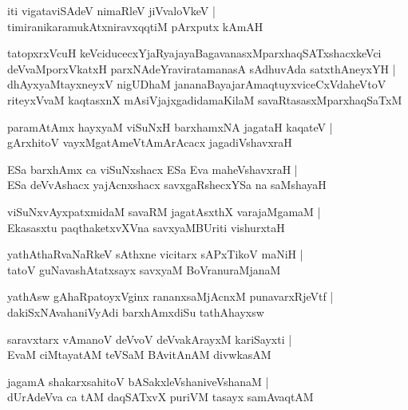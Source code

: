 \begin{shloka}
iti vigataviSAdeV nimaRleV jiVvaloVkeV |\\
timiranikaramukAtxniravxqqtiM pArxputx kAmAH
\end{shloka}

\begin{shloka}
tatopxrxVcuH keVciducecxYjaRyajayaBagavanasxMparxhaqSATxshacxkeVci\\
deVvaMporxVkatxH parxNAdeYraviratamanasA sAdhuvAda satxthAneyxYH |\\
dhAyxyaMtayxneyxV nigUDhaM jananaBayajarAmaqtuyxviceCxVdaheVtoV
riteyxVvaM kaqtasxnX mAsiVjajxgadidamaKilaM savaRtasasxMparxhaqSaTxM
\end{shloka}

\begin{shloka}
paramAtAmx hayxyaM viSuNxH barxhamxNA jagataH kaqateV |\\
gArxhitoV vayxMgatAmeVtAmArAcacx jagadiVshavxraH 
\end{shloka}

\begin{shloka}
ESa barxhAmx ca viSuNxshacx ESa Eva maheVshavxraH |\\
ESa deVvAshacx yajAcnxshacx savxgaRshecxYSa na saMshayaH 
\end{shloka}

\begin{shloka}
viSuNxvAyxpatxmidaM savaRM jagatAsxthX varajaMgamaM |\\
Ekasasxtu paqthaketxvXVna savxyaMBUriti vishurxtaH
\end{shloka}

\begin{shloka}
yathAthaRvaNaRkeV sAthxne vicitarx sAPxTikoV maNiH |\\
tatoV guNavashAtatxsayx savxyaM BoVranuraMjanaM
\end{shloka}

\begin{shloka}
yathAsw gAhaRpatoyxVginx rananxsaMjAcnxM punavarxRjeVtf |\\
dakiSxNAvahaniVyAdi barxhAmxdiSu tathAhayxsw
\end{shloka}

\begin{shloka}
saravxtarx vAmanoV deVvoV deVvakArayxM kariSayxti |\\
EvaM ciMtayatAM teVSaM BAvitAnAM divwkasAM
\end{shloka}

\begin{shloka}
jagamA shakarxsahitoV bASakxleVshaniveVshanaM |\\
dUrAdeVva ca tAM daqSATxvX puriVM tasayx samAvaqtAM 
\end{shloka}

